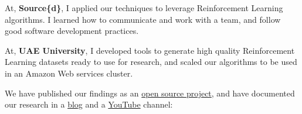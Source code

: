\documentclass[a4paper,11pt]{article}
\begin{document}
At, \textbf{Source\{d\}}, I applied our techniques to leverage Reinforcement Learning algorithms. I learned how to communicate and work with a team, and follow good software development practices.

At, \textbf{UAE University}, I developed tools to generate high quality Reinforcement Learning datasets ready to use for research, and scaled our algorithms to be used in an Amazon Web services cluster.

We have published our findings as an \href{https://github.com/FragileTheory/FractalAI}{open source project}, and have documented our research in a \href{http://entropicai.blogspot.com.es/2017/06/openai-first-record.html}{blog} and a \href{https://www.youtube.com/user/finaysergio/videos}{YouTube} channel:\\
\end{document}
